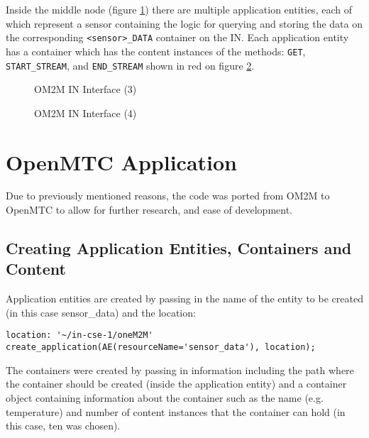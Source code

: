 Inside the middle node (figure \ref{fig:OM2MInterface3}) there are multiple application entities, each of which represent a sensor containing the logic for querying and storing the data on the corresponding \lstinline{<sensor>_DATA} container on the IN. Each application entity has a container which has the content instances of the methods: \lstinline{GET}, \lstinline{START_STREAM}, and \lstinline{END_STREAM} shown in red on figure \ref{fig:OM2MInterface4}.

\begin{figure}[H]
  \centering
  \caption{OM2M IN Interface (3)}
  \label{fig:OM2MInterface3}
\end{figure}

\begin{figure}[H]
  \centering
  \caption{OM2M IN Interface (4)}
  \label{fig:OM2MInterface4}
\end{figure}

\section{OpenMTC Application}

Due to previously mentioned reasons, the code was ported from OM2M to OpenMTC to allow for further research, and ease of development.

\subsection{Creating Application Entities, Containers and Content}

Application entities are created by passing in the name of the entity to be created (in this case sensor\_data) and the location:\\

\begin{lstlisting}[caption={Creating Application Entities}, label={lst:creating-ae}]
location: '~/in-cse-1/oneM2M'
create_application(AE(resourceName='sensor_data'), location);
\end{lstlisting}

The containers were created by passing in information including the path where the container should be created (inside the application entity) and a container object containing information about the container such as the name (e.g. temperature) and number of content instances that the container can hold (in this case, ten was chosen).\\

